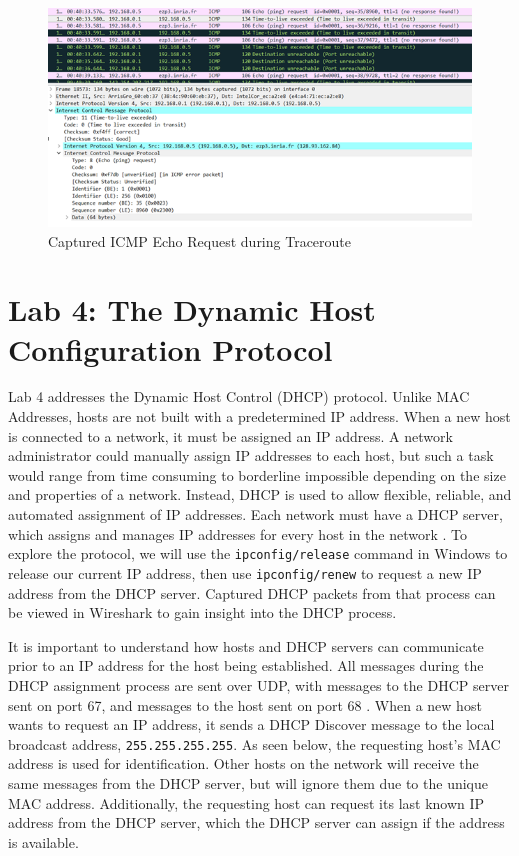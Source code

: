 \documentclass[10pt]{IEEEtran}
\begin{document}
\begin{figure}[h!]
	\includegraphics[width=\linewidth]{traceError.png}
	\caption{Captured ICMP Echo Request during Traceroute}
	\label{fig:traceError}
\end{figure}

\section{Lab 4: The Dynamic Host Configuration Protocol}

 Lab 4 addresses the Dynamic Host Control (DHCP) protocol. Unlike MAC Addresses, hosts are not built with a predetermined IP address. When a new host is connected to a network, it must be assigned an IP address. A network administrator could manually assign IP addresses to each host, but such a task would range from time consuming to borderline impossible depending on the size and properties of a network. Instead, DHCP is used to allow flexible, reliable, and automated assignment of IP addresses. Each network must have a DHCP server, which assigns and manages IP addresses for every host in the network \cite{tanenbaum}. To explore the protocol, we will use the {\tt ipconfig/release} command in Windows to release our current IP address, then use {\tt ipconfig/renew} to request a new IP address from the DHCP server. Captured DHCP packets from that process can be viewed in Wireshark to gain insight into the DHCP process.

It is important to understand how hosts and DHCP servers can communicate prior to an IP address for the host being established. All messages during the DHCP assignment process are sent over UDP, with messages to the DHCP server sent on port 67, and messages to the host sent on port 68 \cite{dhcp}. When a new host wants to request an IP address, it sends a DHCP Discover message to the local broadcast address, {\tt 255.255.255.255}. As seen below, the requesting host's MAC address is used for identification. Other hosts on the network will receive the same messages from the DHCP server, but will ignore them due to the unique MAC address. Additionally, the requesting host can request its last known IP address from the DHCP server, which the DHCP server can assign if the address is available.\\
\end{document}
